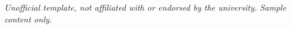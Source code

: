 \documentclass[a4paper,twoside]{ociamthesis}
\begin{document}
\begin{romanpages}


\maketitle
\thispagestyle{empty}\begin{center}{\footnotesize\itshape Unofficial template, not affiliated with or endorsed by the university. Sample content only.\par}\end{center}


\begin{acknowledgements}
 	
\end{acknowledgements}

\begin{abstract}
	
\end{abstract}

\dominitoc %

\flushbottom


\end{romanpages}
\end{document}
